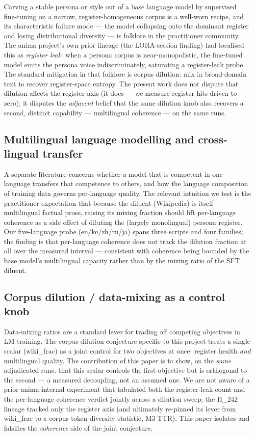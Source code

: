 \documentclass[11pt,a4paper]{article}
\begin{document}
Carving a stable persona or style out of a base language model by
supervised fine-tuning on a narrow, register-homogeneous corpus is a
well-worn recipe, and its characteristic failure mode --- the model
collapsing onto the dominant register and losing distributional diversity
--- is folklore in the practitioner community. The anima project's own
prior lineage (the LORA-session finding) had localised this as
\emph{register leak}: when a persona corpus is near-monopolistic, the
fine-tuned model emits the persona voice indiscriminately, saturating a
register-leak probe. The standard mitigation in that folklore is corpus
dilution: mix in broad-domain text to recover register-space entropy. The
present work does not dispute that dilution affects the register axis (it
does --- we measure register hits driven to zero); it disputes the
\emph{adjacent} belief that the same dilution knob also recovers a
second, distinct capability --- multilingual coherence --- on the same
runs.

\subsection{Multilingual language modelling and cross-lingual transfer}

A separate literature concerns whether a model that is competent in one
language transfers that competence to others, and how the language
composition of training data governs per-language quality. The relevant
intuition we test is the practitioner expectation that because the
diluent (Wikipedia) is itself multilingual factual prose, raising its
mixing fraction should lift per-language coherence as a side effect of
diluting the (largely monolingual) persona register. Our five-language
probe (en/ko/zh/ru/ja) spans three scripts and four families; the finding
is that per-language coherence does not track the dilution fraction at
all over the measured interval --- consistent with coherence being
bounded by the base model's multilingual capacity rather than by the
mixing ratio of the SFT diluent.

\subsection{Corpus dilution / data-mixing as a control knob}

Data-mixing ratios are a standard lever for trading off competing
objectives in LM training. The corpus-dilution conjecture specific to
this project treats a single scalar (wiki\_frac) as a joint control for
two objectives at once: register health \emph{and} multilingual quality.
The contribution of this paper is to show, on the \emph{same} adjudicated
runs, that this scalar controls the first objective but is orthogonal to
the second --- a measured decoupling, not an assumed one. We are not
aware of a prior anima-internal experiment that tabulated both the
register-leak count and the per-language coherence verdict jointly across
a dilution sweep; the H\_242 lineage \citep{anima2026h242} tracked only
the register axis (and ultimately re-pinned its lever from wiki\_frac to a
corpus token-diversity statistic, M3 TTR). This paper isolates and
falsifies the \emph{coherence} side of the joint conjecture.
\end{document}
